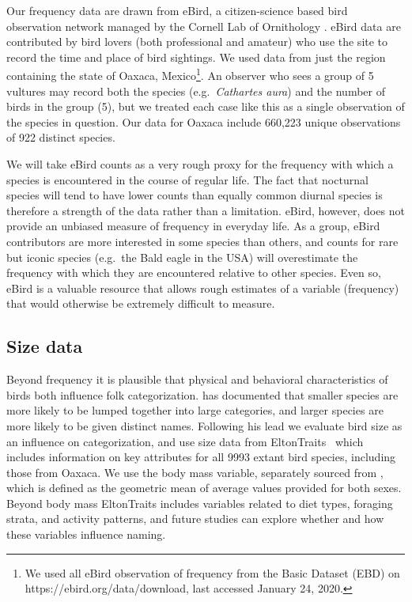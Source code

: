 \documentclass[10pt,letterpaper]{article}
\begin{document}
Our frequency data are drawn from eBird, a citizen-science based bird observation network managed by the Cornell Lab of Ornithology \cite{sullivan2009ebird}.  eBird data are contributed by bird lovers (both professional and amateur) who use the site to record the time and place of bird sightings.  We used data from just the region containing the state of Oaxaca, Mexico\footnote{We used all eBird observation of frequency from the Basic Dataset (EBD) on https://ebird.org/data/download, last accessed January 24, 2020.}. An observer who sees a group of 5 vultures may record both the species (e.g.\ \emph{Cathartes aura}) and the number of birds in the group (5), but we treated each case like this as a single observation of the species in question. Our data for Oaxaca include 660,223 unique observations of 922 distinct species. 

We will take eBird counts as a very rough proxy for the frequency with which a species is encountered in the course of regular life. The fact that nocturnal species will tend to have lower counts than equally common diurnal species is therefore a strength of the data rather than a limitation. eBird, however,  does not provide an unbiased measure of frequency in everyday life. As a group, eBird contributors are more interested in some species than others, and counts for rare but iconic species (e.g.\ the Bald eagle in the USA) will overestimate the frequency with which they are encountered relative to other species. Even so, eBird is a valuable resource that allows rough estimates of a variable (frequency) that would otherwise be extremely difficult to measure.  


\subsection{Size data}
Beyond frequency it is plausible that physical and behavioral characteristics of birds both influence folk categorization.   has documented that smaller species are more likely to be lumped together into large categories, and larger species are more likely to be given distinct names. Following his lead we evaluate bird size as an influence on categorization, and use size data from EltonTraits~\cite{wilman2014eltontraits} which includes information on key attributes for all 9993 extant bird species, including those from Oaxaca.  We use the body mass variable, separately sourced from \cite{dunning2007crc}, which is defined as the geometric mean of average values provided for both sexes. Beyond body mass EltonTraits includes variables related to diet types, foraging strata, and activity patterns, and future studies can explore whether and how these variables influence naming. 
\end{document}

